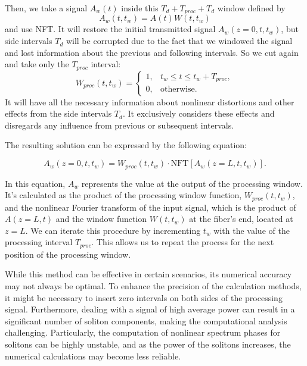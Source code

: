 Then, we take a signal $A_w(t)$ inside this $T_d + T_{proc} + T_d$ window defined by 
\begin{equation}
    A_w(t, t_w) = A(t) W(t, t_w)
\label{eq:window}
\end{equation}
and use NFT. 
It will restore the initial transmitted signal $A_w(z = 0, t, t_w)$, but side intervals $T_d$ will be corrupted due to the fact that we windowed the signal and lost information about the previous and following intervals. So we cut again and take only the $T_{proc}$ interval:
\begin{equation}
W_{proc}(t, t_w) = \begin{cases}
1, & t_w \leq t \leq t_w + T_{proc}, \\
0, & \text{otherwise} {.}
\end{cases}
\end{equation}
It will have all the necessary information about nonlinear distortions and other effects from the side intervals $T_d$. It exclusively considers these effects and disregards any influence from previous or subsequent intervals.

The resulting solution can be expressed by the following equation:

\begin{equation}
A_w(z = 0, t, t_w) = W_{proc}(t, t_w) \cdot \mathrm{NFT}[A_w(z = L, t, t_w)] {.}
\end{equation}

In this equation, $A_w$ represents the value at the output of the processing window. It's calculated as the product of the processing window function, $W_{proc}(t, t_w)$, and the nonlinear Fourier transform of the input signal, which is the product of $A(z=L,t)$ and the window function $W(t, t_w)$ at the fiber's end, located at $z=L$. We can iterate this procedure by incrementing $t_w$ with the value of the processing interval $T_{proc}$. This allows us to repeat the process for the next position of the processing window.

While this method can be effective in certain scenarios, its numerical accuracy may not always be optimal. To enhance the precision of the calculation methods, it might be necessary to insert zero intervals on both sides of the processing signal. Furthermore, dealing with a signal of high average power can result in a significant number of soliton components, making the computational analysis challenging. Particularly, the computation of nonlinear spectrum phases for solitons can be highly unstable, and as the power of the solitons increases, the numerical calculations may become less reliable.

